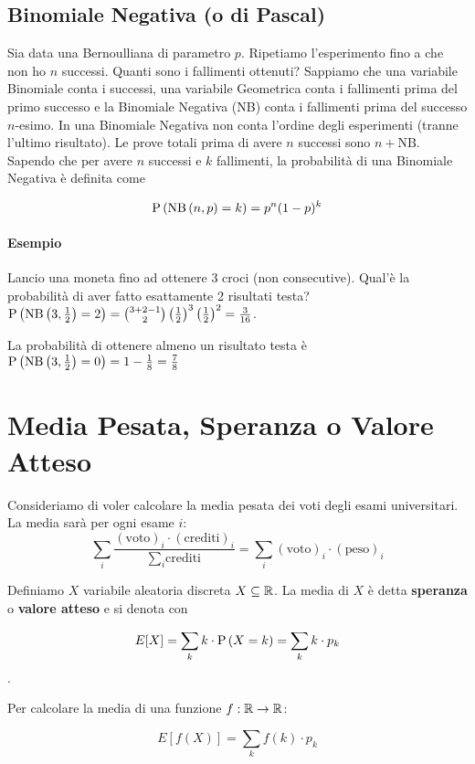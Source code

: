 \begin{enumerate}
\end{enumerate}

\subsection{Binomiale Negativa (o di Pascal)}
Sia data una Bernoulliana di parametro $ p $. Ripetiamo l'esperimento fino a che non ho $ n $ successi. Quanti sono i fallimenti ottenuti? Sappiamo che una variabile Binomiale conta i successi, una variabile Geometrica conta i fallimenti prima del primo successo e la Binomiale Negativa (NB) conta i fallimenti prima del successo $ n $-esimo. In una Binomiale Negativa non conta l'ordine degli esperimenti (tranne l'ultimo risultato). Le prove totali prima di avere $ n $ successi sono $ n+\text{NB} $. Sapendo che per avere $ n $ successi e $ k $ fallimenti, la probabilità di una Binomiale Negativa è definita come 

\[ \text{P}\left(\text{NB}\left(n, p\right) = k\right) = p^n(1-p)^k \] 

\paragraph{Esempio} 
Lancio una moneta fino ad ottenere 3 croci (non consecutive). Qual'è la probabilità di aver fatto esattamente 2 risultati testa? $ \text{P}\left(\text{NB}\left(3, \frac{1}{2}\right) = 2\right) = \binom{3+2-1}{2} \left(\frac{1}{2}\right)^3 \left(\frac{1}{2}\right)^2 = \frac{3}{16} $. 

La probabilità di ottenere almeno un risultato testa è $ \text{P}\left(\text{NB}\left(3, \frac{1}{2}\right) = 0\right) = 1 - \frac{1}{8} = \frac{7}{8} $

\section{Media Pesata, Speranza o Valore Atteso}
Consideriamo di voler calcolare la media pesata dei voti degli esami universitari. La media sarà per ogni esame $ i $:
\[ \sum_{i} \dfrac{(\text{voto})_i \cdot (\text{crediti})_i }{\sum_{i} \text{crediti}} = \sum_{i} (\text{voto})_i \cdot (\text{peso})_i \]

Definiamo $ X $ variabile aleatoria discreta $ X \subseteq \mathbb{R} $. La media di $ X $ è detta \textbf{speranza} o \textbf{valore atteso} e si denota con

\[ E[X] = \sum_{k} k \cdot \text{P}\left(X = k\right) = \sum_{k} k \cdot p_k \].

Per calcolare la media di una funzione $ f : \mathbb{R} \to \mathbb{R} $:

\[ E[f(X)] = \sum_{k} f(k) \cdot p_k \]

